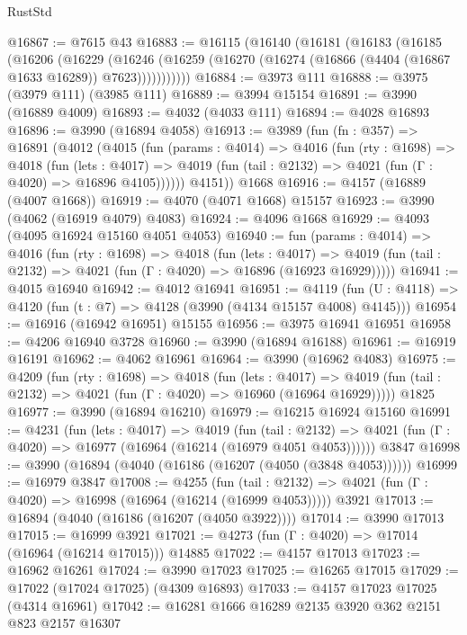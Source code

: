 \begin{lexlean}{RustStd}
\begin{coremodule}
{\begin{coremodule}
{{{{{{{{{{{{{{{{@16867 := @7615 @43
@16883 := @16115
    (@16140
      (@16181
        (@16183
          (@16185
            (@16206
              (@16229
                (@16246
                  (@16259 (@16270 (@16274 (@16866 (@4404 (@16867 @1633 @16289)) @7623)))))))))))
@16884 := @3973 @111
@16888 := @3975 (@3979 @111) (@3985 @111)
@16889 := @3994 @15154
@16891 := @3990 (@16889 @4009)
@16893 := @4032 (@4033 @111)
@16894 := @4028 @16893
@16896 := @3990 (@16894 @4058)
@16913 := @3989
    (fun (fn : @357) =>
    @16891
      (@4012
        (@4015
          (fun (params : @4014) =>
          @4016
            (fun (rty : @1698) =>
            @4018
              (fun (lets : @4017) =>
              @4019 (fun (tail : @2132) => @4021 (fun (Γ : @4020) => @16896 @4105))))))
        @4151))
    @1668
@16916 := @4157 (@16889 (@4007 @1668))
@16919 := @4070 (@4071 @1668) @15157
@16923 := @3990 (@4062 (@16919 @4079) @4083)
@16924 := @4096 @1668
@16929 := @4093 (@4095 @16924 @15160 @4051 @4053)
@16940 := fun (params : @4014) =>
  @4016
    (fun (rty : @1698) =>
    @4018
      (fun (lets : @4017) =>
      @4019 (fun (tail : @2132) => @4021 (fun (Γ : @4020) => @16896 (@16923 @16929)))))
@16941 := @4015 @16940
@16942 := @4012 @16941
@16951 := @4119
    (fun (U : @4118) => @4120 (fun (t : @7) => @4128 (@3990 (@4134 @15157 @4008) @4145)))
@16954 := @16916 (@16942 @16951) @15155
@16956 := @3975 @16941 @16951
@16958 := @4206 @16940 @3728
@16960 := @3990 (@16894 @16188)
@16961 := @16919 @16191
@16962 := @4062 @16961
@16964 := @3990 (@16962 @4083)
@16975 := @4209
    (fun (rty : @1698) =>
    @4018
      (fun (lets : @4017) =>
      @4019 (fun (tail : @2132) => @4021 (fun (Γ : @4020) => @16960 (@16964 @16929)))))
    @1825
@16977 := @3990 (@16894 @16210)
@16979 := @16215 @16924 @15160
@16991 := @4231
    (fun (lets : @4017) =>
    @4019
      (fun (tail : @2132) =>
      @4021 (fun (Γ : @4020) => @16977 (@16964 (@16214 (@16979 @4051 @4053))))))
    @3847
@16998 := @3990 (@16894 (@4040 (@16186 (@16207 (@4050 (@3848 @4053))))))
@16999 := @16979 @3847
@17008 := @4255
    (fun (tail : @2132) => @4021 (fun (Γ : @4020) => @16998 (@16964 (@16214 (@16999 @4053)))))
    @3921
@17013 := @16894 (@4040 (@16186 (@16207 (@4050 @3922))))
@17014 := @3990 @17013
@17015 := @16999 @3921
@17021 := @4273 (fun (Γ : @4020) => @17014 (@16964 (@16214 @17015))) @14885
@17022 := @4157 @17013
@17023 := @16962 @16261
@17024 := @3990 @17023
@17025 := @16265 @17015
@17029 := @17022 (@17024 @17025) (@4309 @16893)
@17033 := @4157 @17023 @17025 (@4314 @16961)
@17042 := @16281 @1666 @16289 @2135 @3920 @362 @2151 @823 @2157 @16307
}}}}}}}}}}}}}}}}
\end{coremodule}}
\end{coremodule}
\end{lexlean}

